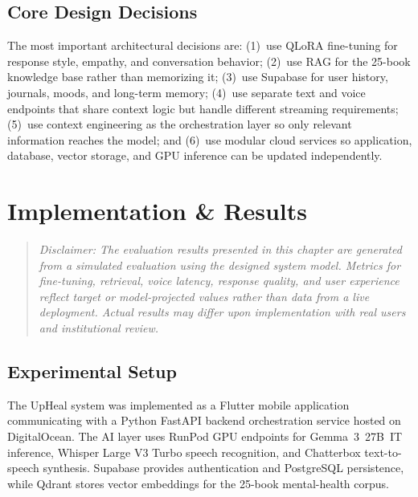 \documentclass[12pt,a4paper,oneside,openany]{report}
\begin{document}
\section{Core Design Decisions}

The most important architectural decisions are: (1)~use QLoRA fine-tuning for response style, empathy, and conversation behavior; (2)~use RAG for the 25-book knowledge base rather than memorizing it; (3)~use Supabase for user history, journals, moods, and long-term memory; (4)~use separate text and voice endpoints that share context logic but handle different streaming requirements; (5)~use context engineering as the orchestration layer so only relevant information reaches the model; and (6)~use modular cloud services so application, database, vector storage, and GPU inference can be updated independently.

\chapter{Implementation \& Results}
\label{ch:impl}

\begin{quote}
\small\itshape Disclaimer: The evaluation results presented in this chapter are generated from a simulated evaluation using the designed system model. Metrics for fine-tuning, retrieval, voice latency, response quality, and user experience reflect target or model-projected values rather than data from a live deployment. Actual results may differ upon implementation with real users and institutional review.
\end{quote}

\section{Experimental Setup}

The UpHeal system was implemented as a Flutter mobile application communicating with a Python FastAPI backend orchestration service hosted on DigitalOcean. The AI layer uses RunPod GPU endpoints for Gemma~3~27B~IT inference, Whisper Large V3 Turbo speech recognition, and Chatterbox text-to-speech synthesis. Supabase provides authentication and PostgreSQL persistence, while Qdrant stores vector embeddings for the 25-book mental-health corpus.
\end{document}
